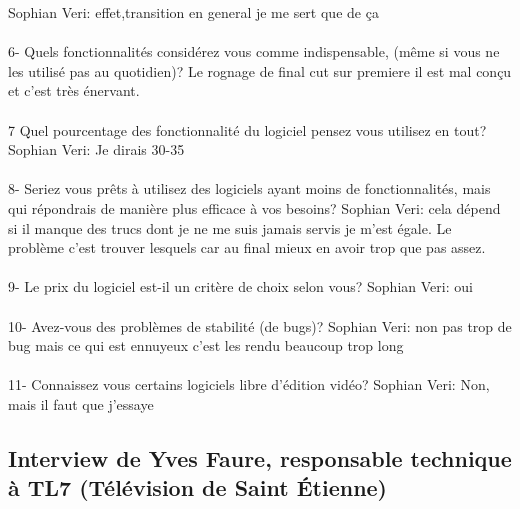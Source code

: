 Sophian Veri: effet,transition en general je me sert que de ça

\paragraph{}
6-  Quels fonctionnalités considérez vous comme indispensable, (même si vous
ne les utilisé pas au quotidien)?
Le rognage de final cut sur premiere il est mal conçu et c'est très
énervant.

\paragraph{}
7 Quel pourcentage des fonctionnalité du logiciel pensez vous utilisez
en tout?
Sophian Veri: Je dirais 30-35%

\paragraph{}
8- Seriez vous prêts à utilisez des logiciels ayant moins de fonctionnalités,
mais qui répondrais de manière plus efficace à vos besoins?
Sophian Veri: cela dépend si il manque des trucs dont je ne me
suis jamais servis je m'est égale. Le problème c'est
trouver lesquels car au final mieux en avoir trop que pas assez.

\paragraph{}
9-  Le prix du logiciel est-il un critère de choix selon vous?
Sophian Veri: oui

\paragraph{}
10- Avez-vous des problèmes de stabilité (de bugs)?
Sophian Veri: non pas trop de bug mais ce qui est ennuyeux c'est les
rendu beaucoup trop long

\paragraph{}
11- Connaissez vous certains logiciels libre d'édition vidéo?
Sophian Veri: Non, mais il faut que j'essaye

\subsection {Interview de Yves Faure,  responsable technique à TL7
(Télévision de Saint Étienne)}

